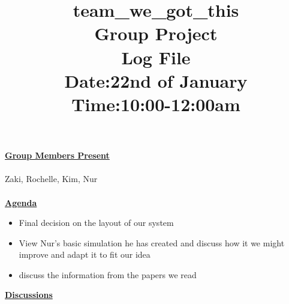 \documentclass{article}
\begin{document}
	\title{team\_we\_got\_this\\ Group Project \\ Log File\\Date:22nd of January\\Time:10:00-12:00am}
	
	\maketitle
	
	
	{\bf\underline{Group Members Present}}\\\\
	Zaki, Rochelle, Kim, Nur\\\\
	
	{\underline	{\bf Agenda}}\\
	\begin{itemize}
		\item Final decision on the layout of our system 
		\item View Nur's basic simulation he has created and discuss how it we might improve and adapt it to fit our idea
		\item discuss the information from the papers we read
	\end{itemize}
	
	{\underline{\bf Discussions}}\\
	
\end{document}
